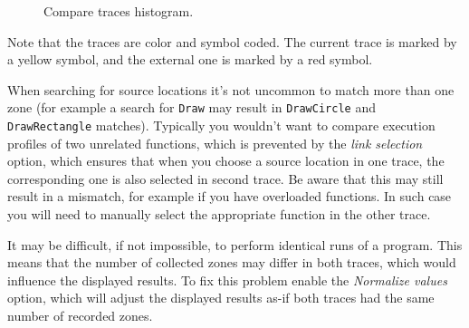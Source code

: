 \documentclass[hidelinks,titlepage,a4paper]{article}
\begin{document}
\begin{figure}[h]
\centering{}
\caption{Compare traces histogram.}
\label{comparehistogram}
\end{figure}

Note that the traces are color and symbol coded. The current trace is marked by a yellow \faLemon{} symbol, and the external one is marked by a red \faGem{} symbol.

When searching for source locations it's not uncommon to match more than one zone (for example a search for \texttt{Draw} may result in \texttt{DrawCircle} and \texttt{DrawRectangle} matches). Typically you wouldn't want to compare execution profiles of two unrelated functions, which is prevented by the \emph{link selection} option, which ensures that when you choose a source location in one trace, the corresponding one is also selected in second trace. Be aware that this may still result in a mismatch, for example if you have overloaded functions. In such case you will need to manually select the appropriate function in the other trace.

It may be difficult, if not impossible, to perform identical runs of a program. This means that the number of collected zones may differ in both traces, which would influence the displayed results. To fix this problem enable the \emph{Normalize values} option, which will adjust the displayed results as-if both traces had the same number of recorded zones.
\end{document}
